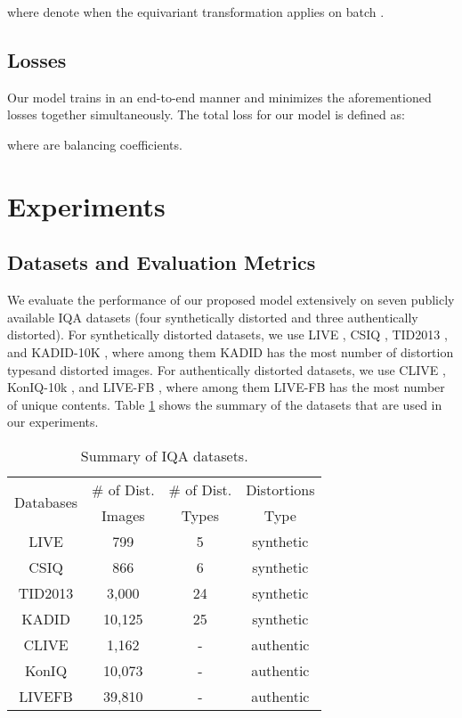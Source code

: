 \documentclass[10pt,twocolumn,letterpaper]{article}
\begin{document}
where  denote when   the equivariant transformation applies on  batch .



\subsection{Losses}
Our model trains in an end-to-end manner and minimizes the aforementioned losses together simultaneously.
The total  loss for our   model is defined as:

where   are balancing coefficients.


\section{Experiments}
\subsection{Datasets and  Evaluation Metrics}
We evaluate the performance of our proposed model extensively on seven publicly available IQA datasets (four synthetically distorted and three authentically distorted).
For synthetically distorted datasets, we use LIVE \cite{sheikh2006statistical}, CSIQ \cite{larson2010most}, TID2013 \cite{ponomarenko2015image}, and KADID-10K \cite{lin2019kadid}, where among them  KADID  has the most number of distortion typesand  distorted images.
For authentically distorted datasets, we use CLIVE \cite{ghadiyaram2015massive},  KonIQ-10k \cite{hosu2020koniq}, and LIVE-FB \cite{ying2019patches}, where among them LIVE-FB has the most number of unique contents.
Table \ref{TB0} shows the summary of the datasets that are used in our experiments.


\begin{table}[h!]
\centering
\caption{Summary of IQA datasets.}
\resizebox{2.1 in}{!} {
\begin{tabular}{cccc}
\hline 
\multirow{2}{*}{Databases} & \# of Dist. & \# of Dist.  & Distortions \tabularnewline
 & Images & Types & Type\tabularnewline
\hline 
LIVE & 799 & 5 & synthetic\tabularnewline
CSIQ & 866 & 6 & synthetic\tabularnewline
TID2013 & 3,000 & 24 & synthetic\tabularnewline
KADID & 10,125 & 25 & synthetic\tabularnewline
CLIVE & 1,162 & - & authentic\tabularnewline
KonIQ & 10,073 & - & authentic\tabularnewline
LIVEFB & 39,810 & - & authentic\tabularnewline
\hline 
\end{tabular}
}
\label{TB0}

\end{table}
\end{document}
